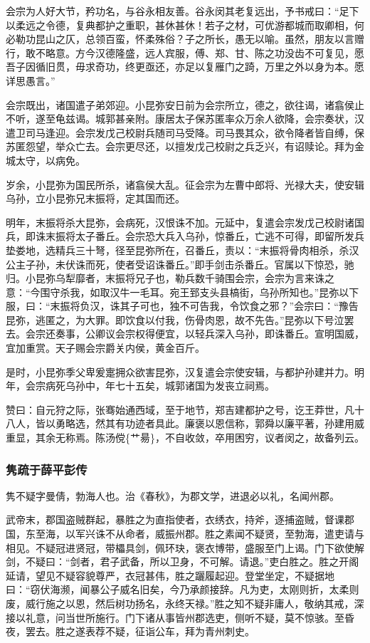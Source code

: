 \documentclass[]{article}
\begin{document}
会宗为人好大节，矜功名，与谷永相友善。谷永闵其老复远出，予书戒曰：``足下以柔远之令德，复典都护之重职，甚休甚休！若子之材，可优游都城而取卿相，何必勒功昆山之仄，总领百蛮，怀柔殊俗？子之所长，愚无以喻。虽然，朋友以言赠行，敢不略意。方今汉德隆盛，远人宾服，傅、郑、甘、陈之功没齿不可复见，愿吾子因循旧贯，毋求奇功，终更亟还，亦足以复雁门之踦，万里之外以身为本。愿详思愚言。''

会宗既出，诸国遣子弟郊迎。小昆弥安日前为会宗所立，德之，欲往谒，诸翕侯止不听，遂至龟兹谒。城郭甚亲附。康居太子保苏匿率众万余人欲降，会宗奏状，汉遣卫司马逢迎。会宗发戊己校尉兵随司马受降。司马畏其众，欲令降者皆自缚，保苏匿怨望，举众亡去。会宗更尽还，以擅发戊己校尉之兵乏兴，有诏赎论。拜为金城太守，以病免。

岁余，小昆弥为国民所杀，诸翕侯大乱。征会宗为左曹中郎将、光禄大夫，使安辑乌孙，立小昆弥兄末振将，定其国而还。

明年，末振将杀大昆弥，会病死，汉恨诛不加。元延中，复遣会宗发戊己校尉诸国兵，即诛末振将太子番丘。会宗恐大兵入乌孙，惊番丘，亡逃不可得，即留所发兵垫娄地，选精兵三十弩，径至昆弥所在，召番丘，责以：``末振将骨肉相杀，杀汉公主子孙，未伏诛而死，使者受诏诛番丘。''即手剑击杀番丘。官属以下惊恐，驰归。小昆弥乌犁靡者，末振将兄子也，勒兵数千骑围会宗，会宗为言来诛之意：``今围守杀我，如取汉牛一毛耳。宛王郅支头县槁街，乌孙所知也。''昆弥以下服，曰：``末振将负汉，诛其子可也，独不可告我，令饮食之邪？''会宗曰：``豫告昆弥，逃匿之，为大罪。即饮食以付我，伤骨肉恩，故不先告。''昆弥以下号泣罢去。会宗还奏事，公卿议会宗权得便宜，以轻兵深入乌孙，即诛番丘。宣明国威，宜加重赏。天子赐会宗爵关内侯，黄金百斤。

是时，小昆弥季父卑爰疐拥众欲害昆弥，汉复遣会宗使安辑，与都护孙建并力。明年，会宗病死乌孙中，年七十五矣，城郭诸国为发丧立祠焉。

赞曰：自元狩之际，张骞始通西域，至于地节，郑吉建都护之号，讫王莽世，凡十八人，皆以勇略选，然其有功迹者具此。廉褒以恩信称，郭舜以廉平著，孙建用威重显，其余无称焉。陈汤傥\{艹昜\}，不自收敛，卒用困穷，议者闵之，故备列云。

\hypertarget{header-n5175}{%
\subsubsection{隽疏于薛平彭传}\label{header-n5175}}

隽不疑字曼倩，勃海人也。治《春秋》，为郡文学，进退必以礼，名闻州郡。

武帝末，郡国盗贼群起，暴胜之为直指使者，衣绣衣，持斧，逐捕盗贼，督课郡国，东至海，以军兴诛不从命者，威振州郡。胜之素闻不疑贤，至勃海，遣吏请与相见。不疑冠进贤冠，带櫑具剑，佩环玦，褒衣博带，盛服至门上谒。门下欲使解剑，不疑曰：``剑者，君子武备，所以卫身，不可解。请退。''吏白胜之。胜之开阁延请，望见不疑容貌尊严，衣冠甚伟，胜之躧履起迎。登堂坐定，不疑据地曰：``窃伏海濒，闻暴公子威名旧矣，今乃承颜接辞。凡为吏，太刚则折，太柔则废，威行施之以恩，然后树功扬名，永终天禄。''胜之知不疑非庸人，敬纳其戒，深接以礼意，问当世所施行。门下诸从事皆州郡选吏，侧听不疑，莫不惊骇。至昏夜，罢去。胜之遂表荐不疑，征诣公车，拜为青州刺史。
\end{document}

